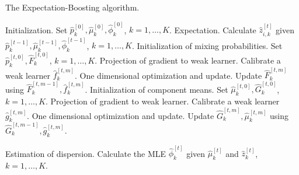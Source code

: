 \documentclass[11pt]{article}
\numberwithin{equation}{section}
\def\bx{\boldsymbol{x}}
\begin{document}
\begin{algorithm}[htp!]
	\caption{The Expectation-Boosting algorithm.} %
	\label{EB} %
	\begin{algorithmic}[1]
	\STATE Initialization. Set  $\hat{p}^{[0]}_k,\hat{\mu}^{[0]}_k,\hat{\phi}_k^{[0]}$, $k=1,\ldots,K$. 
	\STATE Expectation. Calculate $\hat{z}^{[t]}_{i,k}$ given $\hat{p}^{[t-1]}_k,\hat{\mu}^{[t-1]}_k,\hat{\phi}^{[t-1]}_k$, $k=1,\ldots,K$. 
	\STATE Initialization of mixing probabilities. Set  $\hat{p}_k^{[t,0]}, \hat{F}_k^{[t,0]}$, $k=1,\ldots, K$.
		\STATE Projection of gradient to weak learner. Calibrate a weak learner $\hat{f}_k^{[t,m]}$. 
		\STATE One dimensional optimization and update. Update $\hat{F}_k^{[t,m]}$ using $\hat{F}_k^{[t,m-1]},\hat{f}_k^{[t,m]}$.
		\ENDFOR
	   \ENDFOR
	\STATE Initialization of component means. Set  $\hat{\mu}_k^{[t,0]}, \hat{G}_k^{[t,0]}$, $k=1,\ldots,K$. 
			\STATE Projection of gradient to weak learner. Calibrate a weak learner $\hat{g}_k^{[t,m]}$.
		\STATE One dimensional optimization and update.	Update $\hat{G}_k^{[t,m]},\hat{\mu}_k^{[t,m]}$ using $\hat{G}_k^{[t,m-1]},\hat{g}_k^{[t,m]}$.
		\ENDFOR
	\ENDFOR

	\STATE Estimation of dispersion. Calculate the MLE $\hat{\phi}^{[t]}_k$ given $\hat{\mu}^{[t]}_k$ and $\hat{z}^{[t]}_k$, $k=1,\ldots,K$.
	\ENDFOR
	\end{algorithmic}
\end{algorithm}
\end{document}
